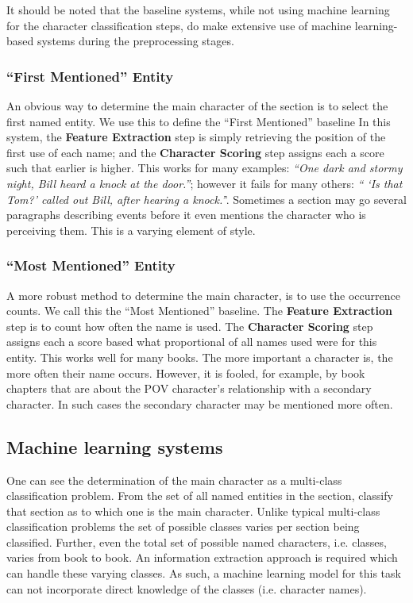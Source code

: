 \documentclass[]{book}
\begin{document}
It should be noted that the baseline systems, while not using machine learning for the character classification steps, do make extensive use of machine learning-based systems during the preprocessing stages.

\subsubsection{``First Mentioned'' Entity}
An obvious way to determine the main character of the section is to select the first named entity.
We use this to define the ``First Mentioned'' baseline
In this system, the \textbf{Feature Extraction} step is simply retrieving the position of the first use of each name;
and the \textbf{Character Scoring} step assigns each a score such that earlier is higher.
This works for many examples: \emph{``One dark and stormy night, Bill heard a knock at the door.''};
however it fails for many others: \emph{`` `Is that Tom?' called out Bill, after hearing a knock.'}'.
Sometimes a section  may go several paragraphs describing events before it even mentions the character who is perceiving them.
This is a varying element of style.

\subsubsection{``Most Mentioned'' Entity}
A more robust method to determine the main character, is to use the occurrence counts.
We call this the ``Most Mentioned'' baseline.
The \textbf{Feature Extraction} step is to count how often the name is used.
The \textbf{Character Scoring} step assigns each a score based what proportional of all names used were for this entity.
This works well for many books.
The more important a character is, the more often their name occurs.
However, it is fooled, for example, by book chapters that are about the POV character's relationship with a secondary character.
In such cases the secondary character may be mentioned more often.

\subsection{Machine learning systems}
One can see the determination of the main character as a multi-class classification problem.
From the set of all named entities in the section, classify that section as to which one is the main character.
Unlike typical multi-class classification problems
the set of possible classes varies per section being classified.
Further, even the total set of possible named characters, i.e.  classes, varies from book to book.
An information extraction approach is required which can handle these varying classes.
As such, a machine learning model for this task can not incorporate direct knowledge of the classes (i.e. character names).
\end{document}

